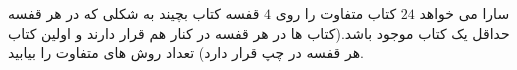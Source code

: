 \exercise
سارا می خواهد 
$24$
 کتاب متفاوت را روی 
$4$
 قفسه کتاب بچیند به شکلی که در هر قفسه حداقل یک کتاب موجود باشد.(کتاب ها در هر قفسه در کنار هم قرار دارند و اولین کتاب هر قفسه در چپ قرار دارد) تعداد روش های متفاوت را بیابید.